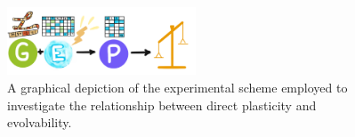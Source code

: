 \begin{figure}
    \includegraphics[width=0.5\textwidth]{img/directscheme}
  \caption{A graphical depiction of the experimental scheme employed to investigate the relationship between direct plasticity and evolvability.}
  \label{fig:direct_plasticity_scheme}
\end{figure}